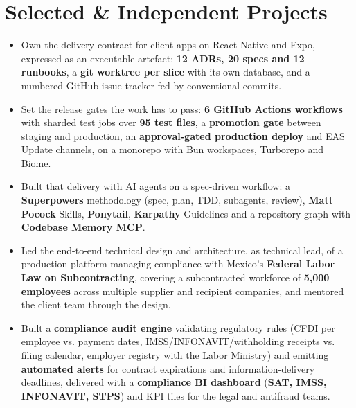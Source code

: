 {\section*{Selected \& Independent Projects}

\begin{itemize}
    \item Own the delivery contract for client apps on React Native and Expo, expressed as an executable artefact: \textbf{12 ADRs, 20 specs and 12 runbooks}, a \textbf{git worktree per slice} with its own database, and a numbered GitHub issue tracker fed by conventional commits.
    \item Set the release gates the work has to pass: \textbf{6 GitHub Actions workflows} with sharded test jobs over \textbf{95 test files}, a \textbf{promotion gate} between staging and production, an \textbf{approval-gated production deploy} and EAS Update channels, on a monorepo with Bun workspaces, Turborepo and Biome.
    \item Built that delivery with AI agents on a spec-driven workflow: a \textbf{Superpowers} methodology (spec, plan, TDD, subagents, review), \textbf{Matt Pocock} Skills, \textbf{Ponytail}, \textbf{Karpathy} Guidelines and a repository graph with \textbf{Codebase Memory MCP}.
\end{itemize}

\begin{itemize}
    \item Led the end-to-end technical design and architecture, as technical lead, of a production platform managing compliance with Mexico's \textbf{Federal Labor Law on Subcontracting}, covering a subcontracted workforce of \textbf{5{,}000 employees} across multiple supplier and recipient companies, and mentored the client team through the design.
    \item Built a \textbf{compliance audit engine} validating regulatory rules (CFDI per employee vs. payment dates, IMSS/INFONAVIT/withholding receipts vs. filing calendar, employer registry with the Labor Ministry) and emitting \textbf{automated alerts} for contract expirations and information-delivery deadlines, delivered with a \textbf{compliance BI dashboard} (\textbf{SAT, IMSS, INFONAVIT, STPS}) and KPI tiles for the legal and antifraud teams.
\end{itemize}
}

